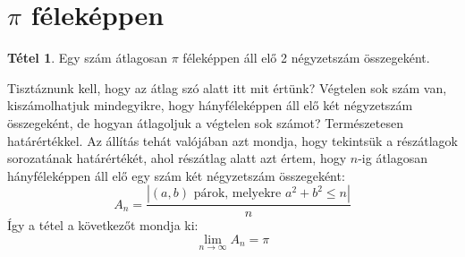 \documentclass[12pt]{book}
\theoremstyle{plain} %
\theoremstyle{definition} %
\newtheorem{theo/}{Tétel}[section]
\newenvironment{theo}
  {\renewcommand{\qedsymbol}{$\clubsuit$}%
   \pushQED{\qed}\begin{theo/}}
  {\popQED\end{theo/}}
\theoremstyle{remark}
\renewcommand\qedsymbol{$\blacksquare$}
\numberwithin{equation}{section}  %
\begin{document}
	\section{$\pi$ féleképpen}
	
	\begin{theo}
		Egy szám átlagosan $\pi$ féleképpen áll elő 2 négyzetszám összegeként.
	\end{theo}

	Tisztáznunk kell, hogy az átlag szó alatt itt mit értünk? Végtelen sok szám van, kiszámolhatjuk mindegyikre, hogy hányféleképpen áll elő két négyzetszám összegeként, de hogyan átlagoljuk a végtelen sok számot? Természetesen határértékkel. Az állítás tehát valójában azt mondja, hogy tekintsük a részátlagok sorozatának határértékét, ahol részátlag alatt azt értem, hogy $n$-ig átlagosan hányféleképpen áll elő egy szám két négyzetszám összegeként:
	\[ A_n = \dfrac{|(a,b) \text{ párok, melyekre } a^2+b^2\leq n|}{n}  \]
	Így a tétel a következőt mondja ki:
	\[ \lim\limits_{n\to \infty} A_n = \pi  \]
\end{document}
